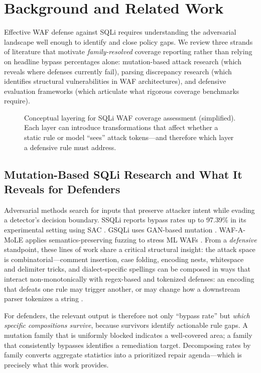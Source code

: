 \section{Background and Related Work}
\label{sec:background}
Effective WAF defense against SQLi requires understanding the adversarial landscape well enough to identify and close policy gaps. We review three strands of literature that motivate \emph{family-resolved} coverage reporting rather than relying on headline bypass percentages alone: mutation-based attack research (which reveals where defenses currently fail), parsing discrepancy research (which identifies structural vulnerabilities in WAF architectures), and defensive evaluation frameworks (which articulate what rigorous coverage benchmarks require).

\begin{figure}[t]
  \centering
  \caption{Conceptual layering for SQLi WAF coverage assessment (simplified). Each layer can introduce transformations that affect whether a static rule or model ``sees'' attack tokens---and therefore which layer a defensive rule must address.}
  \label{fig:related-taxonomy}
\end{figure}

\subsection{Mutation-Based SQLi Research and What It Reveals for Defenders}
Adversarial methods search for inputs that preserve attacker intent while evading a detector's decision boundary. SSQLi reports bypass rates up to 97.39\% in its experimental setting using SAC \cite{guan2023ssqli}. GSQLi uses GAN-based mutation \cite{khan2024gsqli}. WAF-A-MoLE applies semantics-preserving fuzzing to stress ML WAFs \cite{demetrio2020wafamole}. From a \emph{defensive} standpoint, these lines of work share a critical structural insight: the attack space is combinatorial---comment insertion, case folding, encoding nests, whitespace and delimiter tricks, and dialect-specific spellings can be composed in ways that interact non-monotonically with regex-based and tokenized defenses: an encoding that defeats one rule may trigger another, or may change how a downstream parser tokenizes a string \cite{mutation-sqli}.

For defenders, the relevant output is therefore not only ``bypass rate'' but \emph{which specific compositions survive}, because survivors identify actionable rule gaps. A mutation family that is uniformly blocked indicates a well-covered area; a family that consistently bypasses identifies a remediation target. Decomposing rates by family converts aggregate statistics into a prioritized repair agenda---which is precisely what this work provides.

